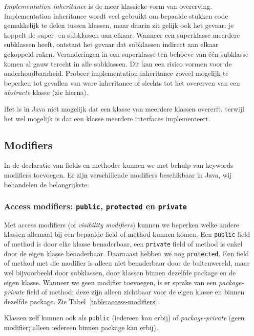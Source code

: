 \textit{Implementation inheritance} is de meer klassieke vorm van overerving.
Implementation inheritance wordt veel gebruikt om bepaalde stukken code gemakkelijk te delen tussen klassen,
maar daarin zit gelijk ook het gevaar: je koppelt de super- en subklassen aan elkaar.
Wanneer een superklasse meerdere subklassen heeft, ontstaat het gevaar dat subklassen indirect 
aan elkaar gekoppeld raken. Veranderingen in een superklasse ten behoeve van één subklasse 
komen al gauw terecht in alle subklassen. Dit kan een risico vormen voor de onderhoudbaarheid.
Probeer implementation inheritance zoveel mogelijk te beperken tot gevallen van ware inheritance 
of slechts tot het overerven van een \textit{abstracte} klasse (zie hierna).

Het is in Java niet mogelijk dat een klasse van meerdere klassen overerft, 
terwijl het wel mogelijk is dat een klasse meerdere interfaces implementeert.

\subsection{Modifiers}
In de declaratie van fields en methodes kunnen we met behulp van keywords modifiers toevoegen.
Er zijn verschillende modifiers beschikbaar in Java, wij behandelen de belangrijkste. 

\subsubsection{Access modifiers: \texttt{public}, \texttt{protected} en \texttt{private}}
Met access modifiers (of \textit{visibility modifiers}) kunnen we 
beperken welke andere klassen allemaal bij een bepaalde field of method kunnen komen.
Een \texttt{public} field of method is door elke klasse benaderbaar, 
een \texttt{private} field of method is enkel door de eigen klasse benaderbaar.
Daarnaast hebben we nog \texttt{protected}. Een field of method met die modifier 
is alleen niet benaderbaar door de buitenwereld, maar wel bijvoorbeeld door 
subklassen, door klassen binnen dezelfde package en de eigen klasse. 
Wanneer we geen modifier toevoegen, is er sprake van een \textit{package-private}
field of method: deze zijn alleen zichtbaar voor de eigen klasse en binnen
dezelfde package. Zie Tabel~\ref{table:access-modifiers}.

Klassen zelf kunnen ook als \texttt{public} (iedereen kan erbij) 
of \textit{package-private} (geen modifier; alleen iedereen binnen package kan erbij).


